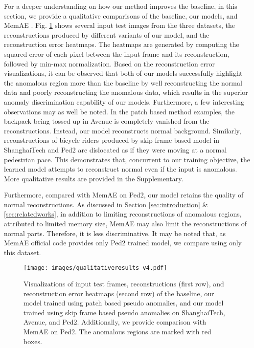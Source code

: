 \documentclass{bmvc2k}
\begin{document}
For a deeper understanding on how our method improves the baseline, in this section, we provide a qualitative comparisons of the baseline, our models, and MemAE \cite{gong2019memorizing}.
Fig. \ref{fig:qualitativeresults} shows several input test images from the three datasets, the reconstructions produced by different variants of our model, and the reconstruction error heatmaps. 
The heatmaps are generated by computing the squared error of each pixel between the input frame and its reconstruction, followed by min-max normalization. Based on the reconstruction error visualizations, it can be observed that both of our models successfully highlight the anomalous region more than the baseline by well reconstructing the normal data and poorly reconstructing the anomalous data, which results in the superior anomaly discrimination capability of our models. 
Furthermore, a few interesting observations may as well be noted. 
In the patch based method examples, the backpack being tossed up in Avenue is completely vanished from the reconstructions. Instead, our model reconstructs normal background. Similarly, reconstructions of bicycle riders produced by skip frame based model in ShanghaiTech and Ped2 are dislocated as if they were moving at a normal pedestrian pace. This demonstrates that, concurrent to our training objective, the learned model attempts to reconstruct normal even if the input is anomalous.
More qualitative results are provided in the Supplementary.


Furthermore, compared with MemAE \cite{gong2019memorizing} on Ped2, our model retains the quality of normal reconstructions. As discussed in Section \ref{sec:introduction} \& \ref{sec:relatedworks}, in addition to limiting reconstructions of anomalous regions, attributed to limited memory size, MemAE may also limit the reconstructions of normal parts. Therefore, it is less discriminative. It may be noted that, as MemAE official code provides only Ped2 trained model, we compare using only this dataset.

\begin{figure}
\begin{center}
\texttt{[image: images/qualitativeresults\_v4.pdf]}
\vspace{-10mm}
\end{center}
   \caption{
Visualizations of input test frames, reconstructions (first row), and reconstruction error heatmaps (second row) of the baseline, our model trained using patch based pseudo anomalies, and our model trained using skip frame based pseudo anomalies on ShanghaiTech, Avenue, and  Ped2. Additionally, we provide comparison with MemAE \cite{gong2019memorizing} on Ped2. The anomalous regions are marked with red boxes. 
}
\label{fig:qualitativeresults}
\vspace{-1mm}
\end{figure}
\end{document}
